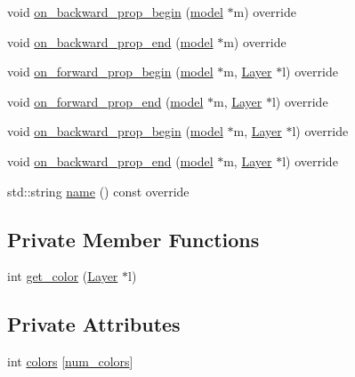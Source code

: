 \begin{DoxyCompactItemize}
\item 
void \hyperlink{classlbann_1_1lbann__callback__profiler_a7905ac8f79a71731c8e388cdb4385023}{on\+\_\+backward\+\_\+prop\+\_\+begin} (\hyperlink{classlbann_1_1model}{model} $\ast$m) override
\item 
void \hyperlink{classlbann_1_1lbann__callback__profiler_a8a4ba2640d128992a519ab4a2b7c44aa}{on\+\_\+backward\+\_\+prop\+\_\+end} (\hyperlink{classlbann_1_1model}{model} $\ast$m) override
\item 
void \hyperlink{classlbann_1_1lbann__callback__profiler_adc7cf77381bec8ab1cc5ba5e554ec268}{on\+\_\+forward\+\_\+prop\+\_\+begin} (\hyperlink{classlbann_1_1model}{model} $\ast$m, \hyperlink{classlbann_1_1Layer}{Layer} $\ast$l) override
\item 
void \hyperlink{classlbann_1_1lbann__callback__profiler_a6cfc4cf84fe4229f627d18ad19eaa415}{on\+\_\+forward\+\_\+prop\+\_\+end} (\hyperlink{classlbann_1_1model}{model} $\ast$m, \hyperlink{classlbann_1_1Layer}{Layer} $\ast$l) override
\item 
void \hyperlink{classlbann_1_1lbann__callback__profiler_a158d8d47bd7a2e38a1f5589030fa523b}{on\+\_\+backward\+\_\+prop\+\_\+begin} (\hyperlink{classlbann_1_1model}{model} $\ast$m, \hyperlink{classlbann_1_1Layer}{Layer} $\ast$l) override
\item 
void \hyperlink{classlbann_1_1lbann__callback__profiler_a3fe2bc2b07b2e8e5873c9afb94cebe93}{on\+\_\+backward\+\_\+prop\+\_\+end} (\hyperlink{classlbann_1_1model}{model} $\ast$m, \hyperlink{classlbann_1_1Layer}{Layer} $\ast$l) override
\item 
std\+::string \hyperlink{classlbann_1_1lbann__callback__profiler_ac58447afa0642c1a466d9b58f0de87c8}{name} () const override
\end{DoxyCompactItemize}
\subsection*{Private Member Functions}
\begin{DoxyCompactItemize}
\item 
int \hyperlink{classlbann_1_1lbann__callback__profiler_af78237a67eaacf2508f31ad72b8ff8a7}{get\+\_\+color} (\hyperlink{classlbann_1_1Layer}{Layer} $\ast$l)
\end{DoxyCompactItemize}
\subsection*{Private Attributes}
\begin{DoxyCompactItemize}
\item 
int \hyperlink{classlbann_1_1lbann__callback__profiler_addf3323ce665956dc4988e3850bceb30}{colors} \mbox{[}\hyperlink{classlbann_1_1lbann__callback__profiler_a48e38406712543f839dd7e5e840694e2}{num\+\_\+colors}\mbox{]}
\end{DoxyCompactItemize}
